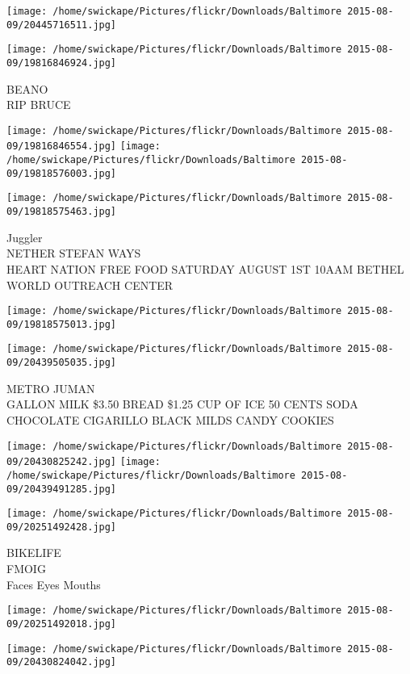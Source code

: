\documentclass[10pt,letterpaper]{article}
\begin{document}
\texttt{[image: /home/swickape/Pictures/flickr/Downloads/Baltimore 2015-08-09/20445716511.jpg]}

\vspace{0.25in}
\texttt{[image: /home/swickape/Pictures/flickr/Downloads/Baltimore 2015-08-09/19816846924.jpg]}

BEANO\\
RIP BRUCE
\pagebreak

\texttt{[image: /home/swickape/Pictures/flickr/Downloads/Baltimore 2015-08-09/19816846554.jpg]}
\texttt{[image: /home/swickape/Pictures/flickr/Downloads/Baltimore 2015-08-09/19818576003.jpg]}

\texttt{[image: /home/swickape/Pictures/flickr/Downloads/Baltimore 2015-08-09/19818575463.jpg]}

Juggler\\
NETHER STEFAN WAYS\\
HEART NATION FREE FOOD SATURDAY AUGUST 1ST 10AAM BETHEL WORLD OUTREACH CENTER
\pagebreak

\texttt{[image: /home/swickape/Pictures/flickr/Downloads/Baltimore 2015-08-09/19818575013.jpg]}

\vspace{0.25in}
\texttt{[image: /home/swickape/Pictures/flickr/Downloads/Baltimore 2015-08-09/20439505035.jpg]}

METRO JUMAN\\
GALLON MILK \$3.50 BREAD \$1.25 CUP OF ICE 50 CENTS SODA CHOCOLATE CIGARILLO BLACK MILDS CANDY COOKIES
\pagebreak

\texttt{[image: /home/swickape/Pictures/flickr/Downloads/Baltimore 2015-08-09/20430825242.jpg]}
\texttt{[image: /home/swickape/Pictures/flickr/Downloads/Baltimore 2015-08-09/20439491285.jpg]}

\vspace{0.25in}
\texttt{[image: /home/swickape/Pictures/flickr/Downloads/Baltimore 2015-08-09/20251492428.jpg]}

BIKELIFE\\
FMOIG\\
Faces Eyes Mouths
\pagebreak

\texttt{[image: /home/swickape/Pictures/flickr/Downloads/Baltimore 2015-08-09/20251492018.jpg]}

\vspace{0.25in}
\texttt{[image: /home/swickape/Pictures/flickr/Downloads/Baltimore 2015-08-09/20430824042.jpg]}
\end{document}
